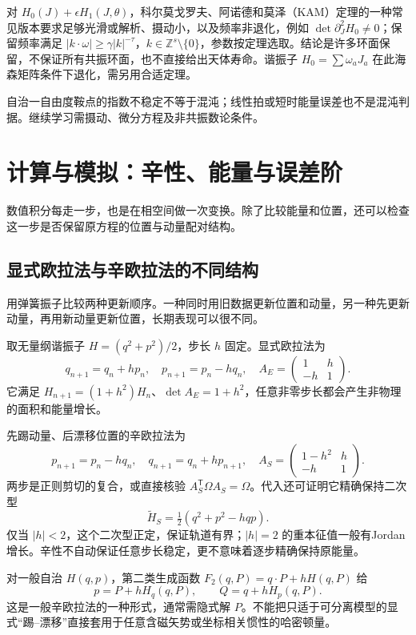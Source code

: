 \begin{modernbox}[title={进一步探索：近可积不等于任意摄动都稳定}]
对 $H_0(J)+\epsilon H_1(J,\theta)$，科尔莫戈罗夫、阿诺德和莫泽（KAM）定理的一种常见版本要求足够光滑或解析、摄动小，以及频率非退化，例如 $\det\partial_J^2H_0\ne0$；保留频率满足 $|k\cdot\omega|\ge\gamma|k|^{-\tau}$，$k\in\mathbb Z^s\setminus\{0\}$，参数按定理选取。结论是许多环面保留，不保证所有共振环面，也不直接给出天体寿命。谐振子 $H_0=\sum\omega_aJ_a$ 在此海森矩阵条件下退化，需另用合适定理。

自治一自由度鞍点的指数不稳定不等于混沌；线性拍或短时能量误差也不是混沌判据。继续学习需摄动、微分方程及非共振数论条件。
\end{modernbox}


\section{计算与模拟：辛性、能量与误差阶}
数值积分每走一步，也是在相空间做一次变换。除了比较能量和位置，还可以检查这一步是否保留原方程的位置与动量配对结构。

\subsection{显式欧拉法与辛欧拉法的不同结构}
用弹簧振子比较两种更新顺序。一种同时用旧数据更新位置和动量，另一种先更新动量，再用新动量更新位置，长期表现可以很不同。

取无量纲谐振子 $H=(q^2+p^2)/2$，步长 $h$ 固定。显式欧拉法为
\[
q_{n+1}=q_n+hp_n,\quad p_{n+1}=p_n-hq_n,
\quad A_E=\begin{pmatrix}1&h\\-h&1\end{pmatrix}.
\]
它满足 $H_{n+1}=(1+h^2)H_n$、$\det A_E=1+h^2$，任意非零步长都会产生非物理的面积和能量增长。

先踢动量、后漂移位置的辛欧拉法为
\[
p_{n+1}=p_n-hq_n,\quad q_{n+1}=q_n+hp_{n+1},\quad
A_S=\begin{pmatrix}1-h^2&h\\-h&1\end{pmatrix}.
\]
两步是正则剪切的复合，或直接核验 $A_S^{\mathsf T}\Omega A_S=\Omega$。代入还可证明它精确保持二次型
\[
\widetilde H_S=\tfrac12(q^2+p^2-hqp).
\]
仅当 $|h|<2$，这个二次型正定，保证轨道有界；$|h|=2$ 的重本征值一般有Jordan增长。辛性不自动保证任意步长稳定，更不意味着逐步精确保持原能量。

对一般自治 $H(q,p)$，第二类生成函数 $F_2(q,P)=q\cdot P+hH(q,P)$ 给
\[
p=P+hH_q(q,P),\qquad Q=q+hH_p(q,P).
\]
这是一般辛欧拉法的一种形式，通常需隐式解 $P$。不能把只适于可分离模型的显式“踢--漂移”直接套用于任意含磁矢势或坐标相关惯性的哈密顿量。

